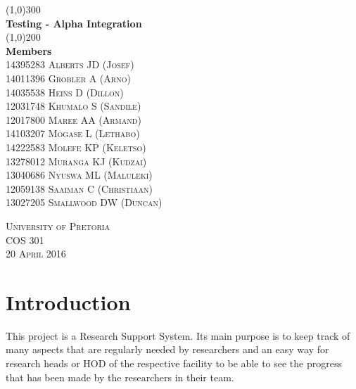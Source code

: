 \documentclass{article}
\begin{document}
\begin{titlepage}
	\begin{center}
		\line(1,0){300}\\
		[6mm]
		\huge{\bfseries Testing - Alpha Integration}\\
		[2mm]
		\line(1,0){200}\\
		[15mm]
		\textbf{\huge Members}\\
		[7.5mm]
		\textsc{
                \large 14395283	Alberts	JD (Josef)\\
                14011396	Grobler	A (Arno) \\
				14035538	Heins	D (Dillon)\\
				12031748	Khumalo	S (Sandile)\\
				12017800	Maree	AA (Armand)\\
                14103207	Mogase	L (Lethabo)\\
                14222583	Molefe	KP (Keletso)\\
                13278012	Muranga	KJ (Kudzai)\\
                13040686	Nyuswa	ML (Maluleki)\\
                12059138	Saaiman	C (Christiaan)\\
                13027205	Smallwood	DW (Duncan)\\[8cm]
            }
    \end{center}

    \begin{flushright}
        \textsc{\large University of Pretoria\\
        COS 301\\
        20 April 2016\\}
    \end{flushright}
\end{titlepage}

\tableofcontents
\thispagestyle{empty}
\cleardoublepage
%

\setcounter{page}{1}
%

\section{Introduction}\label{sec:intro}
    This project is a Research Support System. Its main purpose is to keep track of many aspects that are regularly needed by researchers and an easy way for research heads or HOD of the respective facility to be able to see the progress that has been made by the researchers in their team.
    
\end{document}
